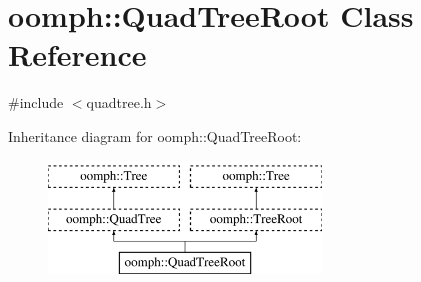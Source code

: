 \hypertarget{classoomph_1_1QuadTreeRoot}{}\section{oomph\+:\+:Quad\+Tree\+Root Class Reference}
\label{classoomph_1_1QuadTreeRoot}


{\ttfamily \#include $<$quadtree.\+h$>$}

Inheritance diagram for oomph\+:\+:Quad\+Tree\+Root\+:\begin{figure}[H]
\begin{center}
\leavevmode
\includegraphics[height=3.000000cm]{classoomph_1_1QuadTreeRoot}
\end{center}
\end{figure}
